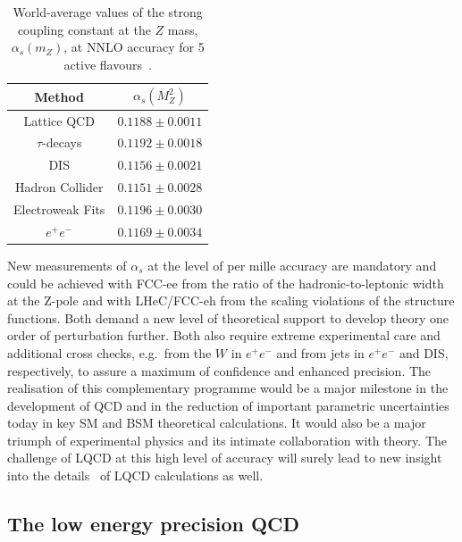 %
%
\begin{table}[h]
\caption{
World-average values of the strong coupling constant at the $Z$ mass,
$\alpha_s(m_Z)$, at NNLO accuracy for 5 active
flavours~\cite{Tanabashi:2018oca}.
}
\begin{center}
\begin{tabular}{|c|c|}
\hline
Method & $\alpha_s(M_Z^2)$ \\
\hline
Lattice QCD & $ 0.1188 \pm 0.0011$ \\
$\tau$-decays & $ 0.1192 \pm 0.0018$ \\
DIS & $ 0.1156 \pm 0.0021$ \\
Hadron Collider & $ 0.1151 \pm 0.0028$ \\
Electroweak Fits & $ 0.1196 \pm 0.0030$ \\
$e^+e^-$  & $ 0.1169 \pm 0.0034$ \\
\hline
\end{tabular}
\label{tabl}
\end{center}
\end{table}

New measurements of $\alpha_s$ at the level of
per mille accuracy are mandatory and could be achieved with FCC-ee from the ratio of the hadronic-to-leptonic
width at the Z-pole and with LHeC/FCC-eh from the scaling violations of
the structure functions.
Both demand a new level of theoretical support to
develop theory one order of perturbation further. Both also require
extreme experimental care and additional cross
checks, e.g.\ from the $W$ in $e^+e^-$ and from jets in $e^+e^-$ and DIS,
respectively, to assure a maximum of confidence and enhanced precision.
The realisation of this complementary programme would be a major
milestone in the development of QCD and in the  reduction of important parametric uncertainties today in key SM and BSM theoretical calculations.
It would also be a
major triumph of experimental physics and its intimate collaboration with theory. The challenge of LQCD at this high level of accuracy will surely lead to new insight into the details~\cite{Aoki:2016frl} of
LQCD calculations as well.



\subsection{The low energy precision QCD}

